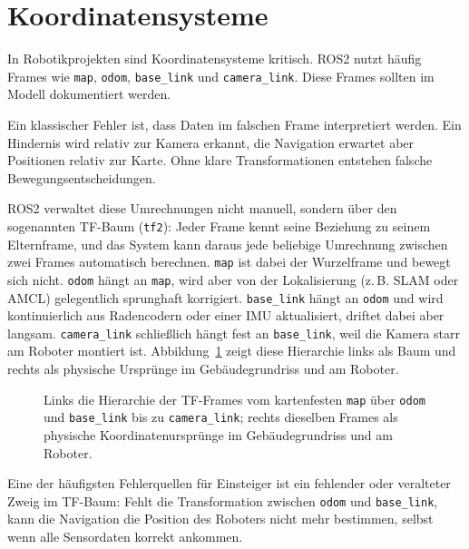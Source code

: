 \section{Koordinatensysteme}
In Robotikprojekten sind Koordinatensysteme kritisch. ROS2 nutzt häufig Frames wie \texttt{map}, \texttt{odom}, \texttt{base\_link} und \texttt{camera\_link}. Diese Frames sollten im Modell dokumentiert werden.

Ein klassischer Fehler ist, dass Daten im falschen Frame interpretiert werden. Ein Hindernis wird relativ zur Kamera erkannt, die Navigation erwartet aber Positionen relativ zur Karte. Ohne klare Transformationen entstehen falsche Bewegungsentscheidungen.

ROS2 verwaltet diese Umrechnungen nicht manuell, sondern über den sogenannten TF-Baum (\texttt{tf2}): Jeder Frame kennt seine Beziehung zu seinem Elternframe, und das System kann daraus jede beliebige Umrechnung zwischen zwei Frames automatisch berechnen. \texttt{map} ist dabei der Wurzelframe und bewegt sich nicht. \texttt{odom} hängt an \texttt{map}, wird aber von der Lokalisierung (z.\,B. SLAM oder AMCL) gelegentlich sprunghaft korrigiert. \texttt{base\_link} hängt an \texttt{odom} und wird kontinuierlich aus Radencodern oder einer IMU aktualisiert, driftet dabei aber langsam. \texttt{camera\_link} schließlich hängt fest an \texttt{base\_link}, weil die Kamera starr am Roboter montiert ist. Abbildung~\ref{fig:kap10-tf-baum} zeigt diese Hierarchie links als Baum und rechts als physische Ursprünge im Gebäudegrundriss und am Roboter.

\begin{figure}[H]
  \centering
  \caption{Links die Hierarchie der TF-Frames vom kartenfesten \texttt{map} über \texttt{odom} und \texttt{base\_link} bis zu \texttt{camera\_link}; rechts dieselben Frames als physische Koordinatenursprünge im Gebäudegrundriss und am Roboter.}
  \label{fig:kap10-tf-baum}
\end{figure}

\begin{hinweisbox}
Eine der häufigsten Fehlerquellen für Einsteiger ist ein fehlender oder veralteter Zweig im TF-Baum: Fehlt die Transformation zwischen \texttt{odom} und \texttt{base\_link}, kann die Navigation die Position des Roboters nicht mehr bestimmen, selbst wenn alle Sensordaten korrekt ankommen.
\end{hinweisbox}

